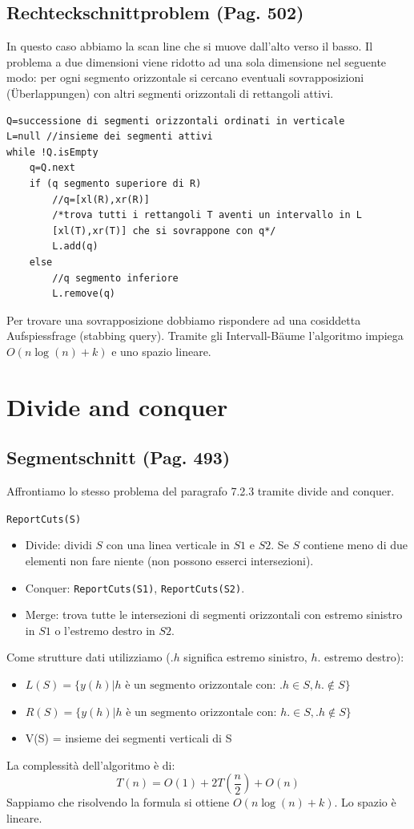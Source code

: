 \documentclass[a4paper]{book}
\newcommand{\inline}[1]{\lstinline!#1!}%
\newcommand{\lstIndent}{4}
\begin{document}
\subsection{Rechteckschnittproblem (Pag. 502)}
In questo caso abbiamo la scan line che si muove dall'alto verso il basso. Il problema a due dimensioni viene ridotto ad una sola dimensione nel seguente modo: per ogni segmento orizzontale si cercano eventuali sovrapposizioni (Überlappungen) con altri segmenti orizzontali di rettangoli attivi.
\begin{lstlisting}[tabsize=\lstIndent]
Q=successione di segmenti orizzontali ordinati in verticale
L=null //insieme dei segmenti attivi
while !Q.isEmpty
	q=Q.next
	if (q segmento superiore di R)
		//q=[xl(R),xr(R)]
		/*trova tutti i rettangoli T aventi un intervallo in L
		[xl(T),xr(T)] che si sovrappone con q*/
		L.add(q)
	else
		//q segmento inferiore
		L.remove(q)			
\end{lstlisting}
Per trovare una sovrapposizione dobbiamo rispondere ad una cosiddetta Aufspiessfrage (stabbing query). Tramite gli Intervall-Bäume l'algoritmo impiega $O(n \log(n)+k)$ e uno spazio lineare.

\section{Divide and conquer}
\subsection{Segmentschnitt (Pag. 493)}
Affrontiamo lo stesso problema del paragrafo 7.2.3 tramite divide and conquer.

\inline{ReportCuts(S)}%
\begin{itemize}
\item Divide: dividi $S$ con una linea verticale in $S1$ e $S2$. Se $S$ contiene meno di due elementi non fare niente (non possono esserci intersezioni).
\item Conquer: \inline{ReportCuts(S1)}, \inline{ReportCuts(S2)}.
\item Merge: trova tutte le intersezioni di segmenti orizzontali con estremo sinistro in $S1$ o l'estremo destro in $S2$.
\end{itemize}
Come strutture dati utilizziamo ($.h$ significa estremo sinistro, $h.$ estremo destro):
\begin{itemize}
\item $L(S) = \{y(h)|\mbox{$h$ è un segmento orizzontale con: } .h\in S, h.\not  \in S\}$
\item $R(S) = \{y(h)|\mbox{$h$ è un segmento orizzontale con: } h.\in S, .h\not  \in S\}$
\item V(S) = insieme dei segmenti verticali di S
\end{itemize}
La complessità dell'algoritmo è di:
$$T(n)=O(1)+2T\left(\frac{n}{2}\right)+O(n)$$
Sappiamo che risolvendo la formula si ottiene $O(n \log(n)+k)$. Lo spazio è lineare.
\end{document}
